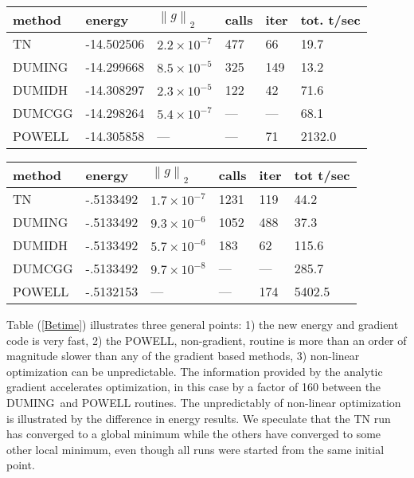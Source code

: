 \documentclass[12pt,thmsa,suthesis,verbatim]{report}
\begin{document}
\begin{tabular}{llllll}
\hline\hline
method & energy & $\left\| g\right\| _2$ & calls & iter & tot. t/sec \\ 
\hline
TN & -14.502506 & $2.2\times 10^{-7}$ & 477 & 66 & 19.7 \\ 
DUMING & -14.299668 & $8.5\times 10^{-5}$ & 325 & 149 & 13.2 \\ 
DUMIDH & -14.308297 & $2.3\times 10^{-5}$ & 122 & 42 & 71.6 \\ 
DUMCGG & -14.298264 & $5.4\times 10^{-7}$ & --- & --- & 68.1 \\ 
POWELL & -14.305858 & --- & --- & 71 & 2132.0 \\ \hline\hline
\end{tabular}
\caption{Comparison of optimization methods using a 4 term $ ^{9}$Be trial
function\label{Betime}}

\begin{tabular}{llllll}
\hline\hline
method & energy & $\left\| g\right\| _2$ & calls & iter & tot t/sec \\ \hline
TN & -.5133492 & $1.7\times 10^{-7}$ & 1231 & 119 & 44.2 \\ 
DUMING & -.5133492 & $9.3\times 10^{-6}$ & 1052 & 488 & 37.3 \\ 
DUMIDH & -.5133492 & $5.7\times 10^{-6}$ & 183 & 62 & 115.6 \\ 
DUMCGG & -.5133492 & $9.7\times 10^{-8}$ & --- & --- & 285.7 \\ 
POWELL & -.5132153 & --- & --- & 174 & 5402.5 \\ \hline\hline
\end{tabular}
\caption{Comparison of optimization methods using an 8 term Ps$_{2}$ trial
function\label{Pstime}}

Table (\ref{Betime}) illustrates three general points: 1) the new energy and
gradient code is very fast, 2) the POWELL, non-gradient, routine is more
than an order of magnitude slower than any of the gradient based methods, 3)
non-linear optimization can be unpredictable. The information provided by
the analytic gradient accelerates optimization, in this case by a factor of
160 between the DUMING\ and POWELL routines. The unpredictably of non-linear
optimization is illustrated by the difference in energy results. We
speculate that the TN run has converged to a global minimum while the others
have converged to some other local minimum, even though all runs were
started from the same initial point.
\end{document}
